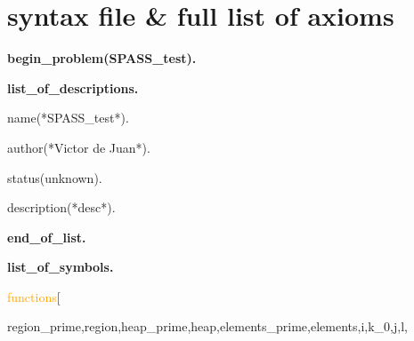 \chapter{\spass syntax file \& full list of axioms}

\label{spass:syntax_file}

\large{\textbf{begin\_problem(SPASS\_test).}}

\small{}

\textbf{list\_of\_descriptions.}

 name({*SPASS\_test*}).

 author({*Victor de Juan*}).

 status(unknown).

 description({*desc*}).

\textbf{end\_of\_list.}


\textbf{list\_of\_symbols.}

\textcolor{orange}{functions}[


    region\_prime,region,heap\_prime,heap,elements\_prime,elements,i,k\_0,j,l,


